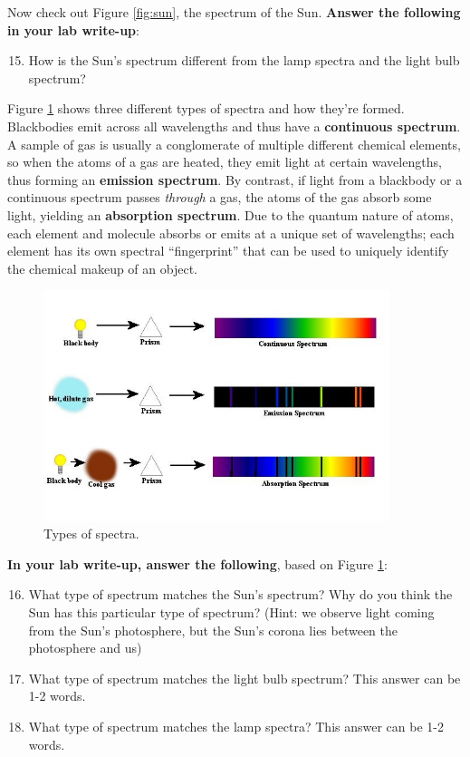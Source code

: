 \documentclass[11pt]{article}
\begin{document}
\noindent
Now check out Figure \ref{fig:sun}, the spectrum of the Sun. \textbf{Answer the following in your lab write-up}:
\begin{enumerate}
    \setcounter{enumi}{14}
    \item How is the Sun's spectrum different from the lamp spectra and the light bulb spectrum?
\end{enumerate}

\bigskip

Figure \ref{fig:types} shows three different types of spectra and how they're formed. Blackbodies emit across all wavelengths and thus have a \textbf{continuous spectrum}. A sample of gas is usually a conglomerate of multiple different chemical elements, so when the atoms of a gas are heated, they emit light at certain wavelengths, thus forming an \textbf{emission spectrum}. By contrast, if light from a blackbody or a continuous spectrum passes \emph{through} a gas, the atoms of the gas absorb some light, yielding an \textbf{absorption spectrum}. Due to the quantum nature of atoms, each element and molecule absorbs or emits at a unique set of wavelengths; each element has its own spectral ``fingerprint'' that can be used to uniquely identify the chemical makeup of an object.

\begin{figure}[h!]
    \centering
    \includegraphics[width=0.9\textwidth,trim={0cm 2cm 0cm 1cm},clip]{Images/emission_v_absorption.jpg}
    \caption{Types of spectra.}
    \label{fig:types}
\end{figure}

\medskip 
\textbf{In your lab write-up, answer the following}, based on Figure \ref{fig:types}:
\begin{enumerate}
    \setcounter{enumi}{15}
    
    \item What type of spectrum matches the Sun's spectrum? Why do you think the Sun has this particular type of spectrum? (Hint: we observe light coming from the Sun's photosphere, but the Sun's corona lies between the photosphere and us)
    
    \item What type of spectrum matches the light bulb spectrum? This answer can be 1-2 words.
    
    \item What type of spectrum matches the lamp spectra? This answer can be 1-2 words.
\end{enumerate}
\end{document}
